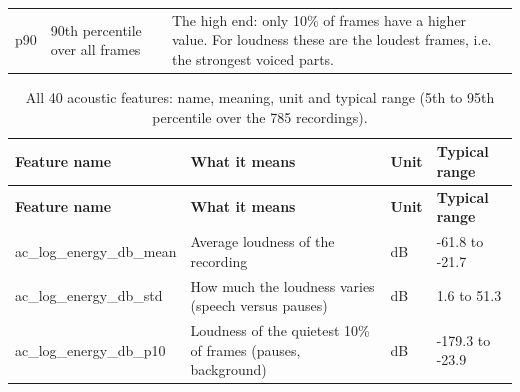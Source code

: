 \documentclass[11pt,a4paper]{article}
\begin{document}
\begin{center}
\begin{longtable}{>{\raggedright\arraybackslash}p{1.76cm}>{\raggedright\arraybackslash}p{4.10cm}>{\raggedright\arraybackslash}p{9.38cm}}
\hspace{0pt}p90 & \hspace{0pt}90th percentile over all frames & \hspace{0pt}The high end: only 10\% of frames have a higher value. For loudness these are the loudest frames, i.e. the strongest voiced parts.\\
\end{longtable}\end{center}
\begin{center}\small\renewcommand{\arraystretch}{1.15}
\begin{longtable}{>{\raggedright\arraybackslash}p{3.70cm}>{\raggedright\arraybackslash}p{6.65cm}>{\raggedright\arraybackslash}p{1.90cm}>{\raggedright\arraybackslash}p{2.56cm}}
\caption{All 40 acoustic features: name, meaning, unit and typical range (5th to 95th percentile over the 785 recordings).}\\
\toprule
\textbf{\hspace{0pt}Feature name} & \textbf{\hspace{0pt}What it means} & \textbf{\hspace{0pt}Unit} & \textbf{\hspace{0pt}Typical range}\\\midrule\endfirsthead
\toprule
\textbf{\hspace{0pt}Feature name} & \textbf{\hspace{0pt}What it means} & \textbf{\hspace{0pt}Unit} & \textbf{\hspace{0pt}Typical range}\\\midrule\endhead
\bottomrule\endfoot
\hspace{0pt}ac\_\allowbreak{}log\_\allowbreak{}energy\_\allowbreak{}db\_\allowbreak{}mean & \hspace{0pt}Average loudness of the recording & \hspace{0pt}dB & \hspace{0pt}-61.8 to -21.7\\
\hspace{0pt}ac\_\allowbreak{}log\_\allowbreak{}energy\_\allowbreak{}db\_\allowbreak{}std & \hspace{0pt}How much the loudness varies (speech versus pauses) & \hspace{0pt}dB & \hspace{0pt}1.6 to 51.3\\
\hspace{0pt}ac\_\allowbreak{}log\_\allowbreak{}energy\_\allowbreak{}db\_\allowbreak{}p10 & \hspace{0pt}Loudness of the quietest 10\% of frames (pauses, background) & \hspace{0pt}dB & \hspace{0pt}-179.3 to -23.9\\

\end{longtable}
\end{center}
\end{document}

